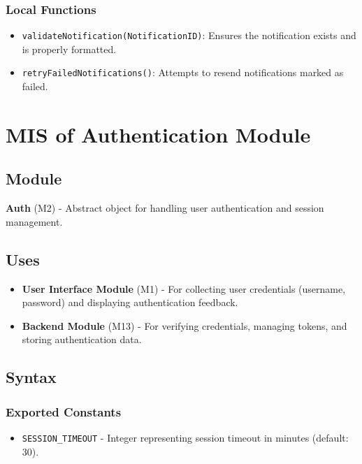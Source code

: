 \documentclass[12pt, titlepage]{article}
\begin{document}
\subsubsection{Local Functions}

\begin{itemize}
  \item \texttt{validateNotification(NotificationID)}: Ensures the notification exists and is properly formatted.
  \item \texttt{retryFailedNotifications()}: Attempts to resend notifications marked as failed.
\end{itemize}

\newpage

\section{MIS of Authentication Module} \label{Auth}

\subsection{Module}

\textbf{Auth} (M2) - Abstract object for handling user authentication and session management.

\subsection{Uses}

\begin{itemize}
  \item \textbf{User Interface Module} (M1) - For collecting user credentials (username, password)
        and displaying authentication feedback.
  \item \textbf{Backend Module} (M13) - For verifying credentials, managing tokens, and storing
        authentication data.
\end{itemize}


\subsection{Syntax}

\subsubsection{Exported Constants}
\begin{itemize}
  \item \texttt{SESSION\_TIMEOUT} - Integer representing session timeout in minutes (default: 30).
\end{itemize}
\end{document}
